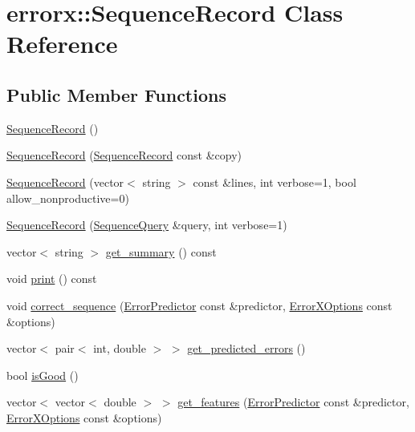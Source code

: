 \hypertarget{classerrorx_1_1_sequence_record}{}\section{errorx\+:\+:Sequence\+Record Class Reference}
\label{classerrorx_1_1_sequence_record}
\subsection*{Public Member Functions}
\begin{DoxyCompactItemize}
\item 
\mbox{\hyperlink{classerrorx_1_1_sequence_record_aa0c7da905f4a027969273d7bfe9c2db8}{Sequence\+Record}} ()
\item 
\mbox{\hyperlink{classerrorx_1_1_sequence_record_a659615c7179fdaaaed5196cc37f93623}{Sequence\+Record}} (\mbox{\hyperlink{classerrorx_1_1_sequence_record}{Sequence\+Record}} const \&copy)
\item 
\mbox{\hyperlink{classerrorx_1_1_sequence_record_ac20b7a31e542e34795be7a0450e6d103}{Sequence\+Record}} (vector$<$ string $>$ const \&lines, int verbose=1, bool allow\+\_\+nonproductive=0)
\item 
\mbox{\hyperlink{classerrorx_1_1_sequence_record_a88499ee66ab4eac51eaf51c7c8c8fd2d}{Sequence\+Record}} (\mbox{\hyperlink{classerrorx_1_1_sequence_query}{Sequence\+Query}} \&query, int verbose=1)
\item 
vector$<$ string $>$ \mbox{\hyperlink{classerrorx_1_1_sequence_record_ada8bdfb462b2ba29808b258f4380dbf0}{get\+\_\+summary}} () const
\item 
void \mbox{\hyperlink{classerrorx_1_1_sequence_record_ab6ef0d5067f8c28aee8fb826b7a5922e}{print}} () const
\item 
void \mbox{\hyperlink{classerrorx_1_1_sequence_record_af399cf58824831f8e12247a64108a925}{correct\+\_\+sequence}} (\mbox{\hyperlink{classerrorx_1_1_error_predictor}{Error\+Predictor}} const \&predictor, \mbox{\hyperlink{classerrorx_1_1_error_x_options}{Error\+X\+Options}} const \&options)
\item 
vector$<$ pair$<$ int, double $>$ $>$ \mbox{\hyperlink{classerrorx_1_1_sequence_record_a40aba7774369da0c35b82c14413143a4}{get\+\_\+predicted\+\_\+errors}} ()
\item 
bool \mbox{\hyperlink{classerrorx_1_1_sequence_record_adcc3a75cb5d42ffef94c1c9552fb7c9e}{is\+Good}} ()
\item 
vector$<$ vector$<$ double $>$ $>$ \mbox{\hyperlink{classerrorx_1_1_sequence_record_ac2e7ec6eff313310ba457d9e374b3c88}{get\+\_\+features}} (\mbox{\hyperlink{classerrorx_1_1_error_predictor}{Error\+Predictor}} const \&predictor, \mbox{\hyperlink{classerrorx_1_1_error_x_options}{Error\+X\+Options}} const \&options)

\end{DoxyCompactItemize}

